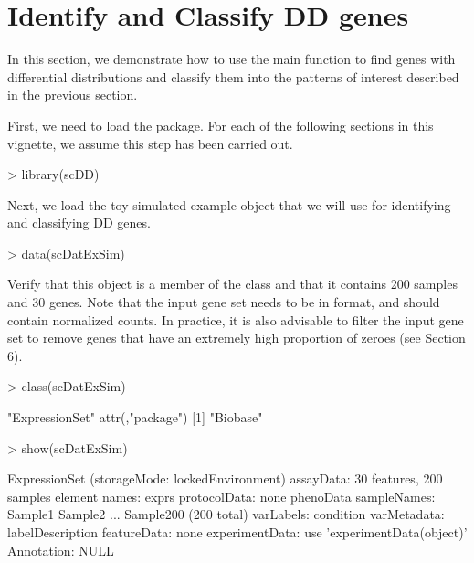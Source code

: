 \documentclass{article}
\begin{document}
\section{Identify and Classify DD genes}
In this section, we demonstrate how to use the main function  to find genes with differential distributions and classify them into the patterns of interest described in the previous section. 

First, we need to load the  package.  For each of the following sections in this vignette, we assume this step has been carried out.
\begin{Schunk}
\begin{Sinput}
> library(scDD)
\end{Sinput}
\end{Schunk}

Next, we load the toy simulated example  object that we will use for identifying and classifying DD genes.
\begin{Schunk}
\begin{Sinput}
> data(scDatExSim)
\end{Sinput}
\end{Schunk}

Verify that this object is a member of the  class and that it contains 200 samples and 30 genes.  Note that the input gene set needs to be in  format, and should contain normalized counts.  In practice, it is also advisable to filter the input gene set to remove genes that have an extremely high proportion of zeroes (see Section 6). 
\begin{Schunk}
\begin{Sinput}
> class(scDatExSim)
\end{Sinput}
\begin{Soutput}
[1] "ExpressionSet"
attr(,"package")
[1] "Biobase"
\end{Soutput}
\begin{Sinput}
> show(scDatExSim)
\end{Sinput}
\begin{Soutput}
ExpressionSet (storageMode: lockedEnvironment)
assayData: 30 features, 200 samples 
  element names: exprs 
protocolData: none
phenoData
  sampleNames: Sample1 Sample2 ... Sample200 (200 total)
  varLabels: condition
  varMetadata: labelDescription
featureData: none
experimentData: use 'experimentData(object)'
Annotation:  
NULL
\end{Soutput}
\end{Schunk}
\end{document}
